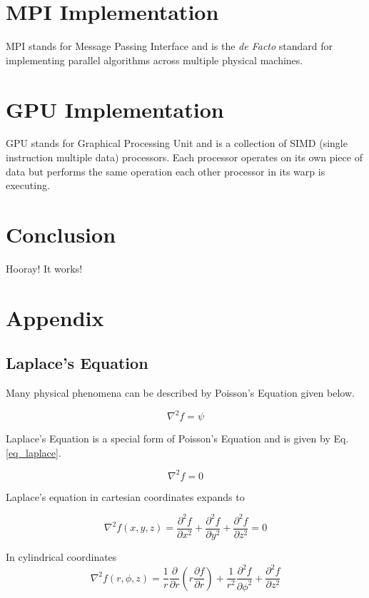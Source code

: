\documentclass{article}
\numberwithin{equation}{subsection}
\begin{document}
\section{MPI Implementation}
MPI stands for Message Passing Interface and is the \textit{de Facto} standard for implementing parallel algorithms across multiple physical machines.

\section{GPU Implementation}
GPU stands for Graphical Processing Unit and is a collection of SIMD (single instruction multiple data) processors. Each processor operates on its own piece of data but performs the same operation each other processor in its warp is executing.

\section{Conclusion}
Hooray! It works!

\section{Appendix}

\subsection{Laplace's Equation} \label{sec_laplace}
Many physical phenomena can be described by Poisson's Equation given below.

\begin{equation} \label{eq_poisson}
\nabla^2 f = \psi
\end{equation}

Laplace's Equation is a special form of Poisson's Equation and is given by Eq. \ref{eq_laplace}.


\begin{equation} \label{eq_laplace}
\nabla^2 f = 0
\end{equation}

Laplace's equation in cartesian coordinates expands to

\begin{equation} \label{eq_laplace_cartesian}
\nabla^2 f(x, y, z) = \frac{\partial^2 f}{\partial x^2} + \frac{\partial^2 f}{\partial y^2} + \frac{\partial^2 f}{\partial z^2} = 0
\end{equation}

In cylindrical coordinates
\begin{equation} \label{eq_laplace_cylindrical}
\nabla^2 f(r, \phi, z) = \frac{1}{r} \frac{\partial}{\partial r}\left( r \frac{\partial f}{\partial r}\right) + \frac{1}{r^2}\frac{\partial^2 f}{\partial \phi^2} + \frac{\partial^2 f}{\partial z^2}
\end{equation}
\end{document}
